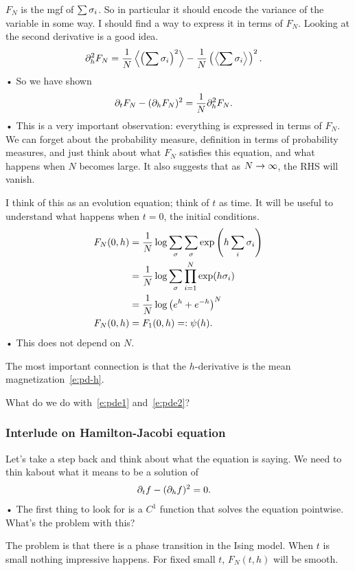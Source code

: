 $F_N$ is the mgf of $\sum\sigma_i$. So in particular it should encode the variance of the variable in some way. I should find a way to express it in terms of $F_N$. Looking at the second derivative is a good idea.
\begin{align*}
\partial_h^2 F_N &= \frac{1}{N} \left\langle {\left( {\sum \sigma_i} \right)^2}\right\rangle - \frac{1}{N}\left( { \left\langle {\sum \sigma_i}\right\rangle} \right)^2.
\end{align*}•
So we have shown
\begin{align}
\partial_t F_N - (\partial_h F_N)^2 &= \frac{1}{N} \partial_h^2 F_N.
\label{e:pde1}
\end{align}•
This is a very important observation: everything is expressed in terms of $F_N$. We can forget about the probability measure, definition in terms of probability measures, and just think about what $F_N$ satisfies this equation, and what happens when $N$ becomes large. It also suggests that as $N\to \infty$, the RHS will vanish.

I think of this as an evolution equation; think of $t$ as time. It will be useful to understand what happens when $t=0$, the initial conditions.
\begin{align}
F_N(0,h) &= \frac{1}{N} \log \sum_\sigma \sum_\sigma \exp\left( {h \sum_i \sigma_i} \right)\\
&= \frac{1}{N} \log \sum_\sigma \prod_{i=1}^{N} \exp(h\sigma_i)\\
&= \frac{1}{N} \log \left( {e^h+e^{-h}} \right)^N\\
F_N(0,h) &= F_1(0,h) =: \psi(h).
\label{e:pde2}
\end{align}•
This does not depend on $N$.

The most important connection %
is that the $h$-derivative is the mean magnetization~\eqref{e:pd-h}.

What do we do with~\eqref{e:pde1} and~\eqref{e:pde2}?  

\subsubsection{Interlude on Hamilton-Jacobi equation}

Let's take a step back and think about what the equation is saying. We need to thin kabout what it means to be a solution of 
\begin{align}
\partial_t f - (\partial_h f)^2&=0.
\end{align}•
The first thing to look for is a $C^1$ function that solves the equation pointwise. What's the problem with this?

The problem is that there is a phase transition in the Ising model. When $t$ is small nothing impressive happens. For fixed small $t$, $F_N(t,h)$ will be smooth. 


